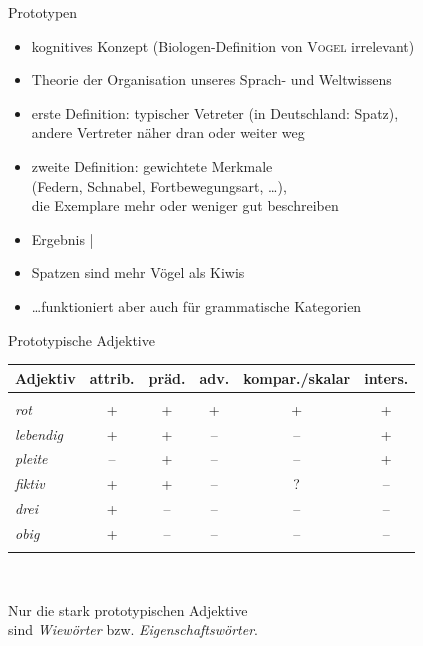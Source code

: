 \begin{frame}
  {Prototypen}
  \begin{itemize}[<+->]
    \item \alert{kognitives Konzept} (Biologen-Definition von \alert{\textsc{Vogel}} irrelevant)
    \item Theorie der Organisation unseres Sprach- und Weltwissens
      \Halbzeile
    \item erste Definition: \alert{typischer Vetreter} (in Deutschland: Spatz),\\
      andere Vertreter näher dran oder weiter weg
    \item zweite Definition: \alert{gewichtete Merkmale}\\
      (Federn, Schnabel, Fortbewegungsart, \ldots),\\
      die Exemplare mehr oder weniger gut beschreiben
      \Zeile
    \item Ergebnis | 
    \item Spatzen sind mehr Vögel als Kiwis
    \item \ldots \alert{funktioniert aber auch für grammatische Kategorien}
  \end{itemize}
\end{frame}

\begin{frame}
  {Prototypische Adjektive}
  \centering 
  \onslide<+->
  \onslide<+->
  \begin{tabular}[h]{lccccc}
    \toprule
    \textbf{Adjektiv} & \textbf{attrib.} & \textbf{präd.} & \textbf{adv.} & \textbf{kompar.\slash skalar} & \textbf{inters.} \\
    \midrule
    &&&&& \\
    \rowfont{\huge}%
    \textit{rot}         & + & + & + & + & + \\
    \rowfont{\normalsize}%
    \textit{lebendig}    & + & + & -- & -- & + \\
    \rowfont{\footnotesize}%
    \textit{pleite}      & -- & + & -- & -- & + \\
    \rowfont{\footnotesize}%
    \textit{fiktiv}      & + & + & -- & ? & -- \\
    \rowfont{\tiny}%
    \textit{drei}        & + & -- & -- & -- & -- \\
    \rowfont{\tiny}%
    \textit{obig}        & + & -- & -- & -- & -- \\
    &&&&& \\
    \bottomrule
  \end{tabular}\\
  \Zeile
  \raggedright
  \onslide<+->
  \alert{Nur die stark prototypischen Adjektive\\
    sind \textit{Wiewörter} bzw. \textit{Eigenschaftswörter}.}\\
    \Halbzeile
\end{frame}

